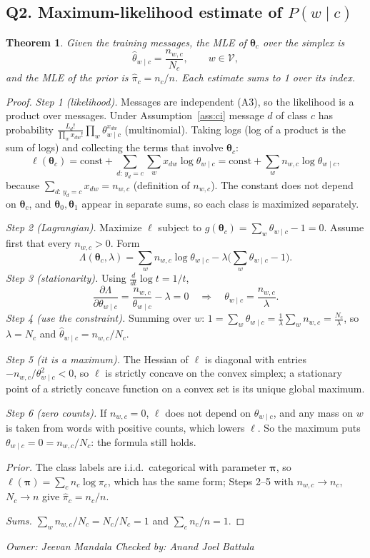 \documentclass[11pt]{article}
\newcommand{\owner}[2]{\par\noindent\textit{Owner: #1 \hfill Checked by: #2}\par\medskip}
\theoremstyle{plain}
\newtheorem{theorem}{Theorem}
\theoremstyle{definition}
\newcommand{\V}{\mathcal{V}}
\begin{document}
\subsection{Q2. Maximum-likelihood estimate of \texorpdfstring{$P(w\mid c)$}{P(w|c)}}\label{sec:q2}

\begin{theorem}\label{thm:mle}
Given the training messages, the MLE of $\boldsymbol\theta_c$ over the simplex is
\[
\hat\theta_{w\mid c}=\frac{n_{w,c}}{N_c},\qquad w\in\V,
\]
and the MLE of the prior is $\hat\pi_c=n_c/n$. Each estimate sums to 1 over its index.
\end{theorem}
\begin{proof}
\textit{Step 1 (likelihood).} Messages are independent (A3), so the likelihood is a product over
messages. Under Assumption~\ref{ass:ci} message $d$ of class $c$ has probability
$\frac{L_d!}{\prod_w x_{dw}!}\prod_w\theta_{w\mid c}^{x_{dw}}$ (multinomial). Taking logs
(log of a product is the sum of logs) and collecting the terms that involve $\boldsymbol\theta_c$:
\[
\ell(\boldsymbol\theta_c)=\text{const}+\sum_{d:\,y_d=c}\sum_{w}x_{dw}\log\theta_{w\mid c}
=\text{const}+\sum_{w}n_{w,c}\log\theta_{w\mid c},
\]
because $\sum_{d:\,y_d=c}x_{dw}=n_{w,c}$ (definition of $n_{w,c}$). The constant does not
depend on $\boldsymbol\theta_c$, and $\boldsymbol\theta_0,\boldsymbol\theta_1$ appear in
separate sums, so each class is maximized separately.

\textit{Step 2 (Lagrangian).} Maximize $\ell$ subject to $g(\boldsymbol\theta_c)=\sum_w\theta_{w\mid c}-1=0$.
Assume first that every $n_{w,c}>0$. Form
\[
\Lambda(\boldsymbol\theta_c,\lambda)=\sum_w n_{w,c}\log\theta_{w\mid c}-\lambda\Big(\sum_w\theta_{w\mid c}-1\Big).
\]
\textit{Step 3 (stationarity).} Using $\frac{d}{dt}\log t=1/t$,
\[
\frac{\partial\Lambda}{\partial\theta_{w\mid c}}=\frac{n_{w,c}}{\theta_{w\mid c}}-\lambda=0
\quad\Longrightarrow\quad\theta_{w\mid c}=\frac{n_{w,c}}{\lambda}.
\]
\textit{Step 4 (use the constraint).} Summing over $w$:
$1=\sum_w\theta_{w\mid c}=\frac{1}{\lambda}\sum_w n_{w,c}=\frac{N_c}{\lambda}$, so $\lambda=N_c$ and
$\hat\theta_{w\mid c}=n_{w,c}/N_c$.

\textit{Step 5 (it is a maximum).} The Hessian of $\ell$ is diagonal with entries
$-n_{w,c}/\theta_{w\mid c}^2<0$, so $\ell$ is strictly concave on the convex simplex; a
stationary point of a strictly concave function on a convex set is its unique global maximum.

\textit{Step 6 (zero counts).} If $n_{w,c}=0$, $\ell$ does not depend on $\theta_{w\mid c}$,
and any mass on $w$ is taken from words with positive counts, which lowers $\ell$. So the
maximum puts $\theta_{w\mid c}=0=n_{w,c}/N_c$: the formula still holds.

\textit{Prior.} The class labels are i.i.d.\ categorical with parameter $\boldsymbol\pi$, so
$\ell(\boldsymbol\pi)=\sum_c n_c\log\pi_c$, which has the same form; Steps 2--5 with
$n_{w,c}\to n_c$, $N_c\to n$ give $\hat\pi_c=n_c/n$.

\textit{Sums.} $\sum_w n_{w,c}/N_c=N_c/N_c=1$ and $\sum_c n_c/n=1$.
\end{proof}
\owner{Jeevan Mandala}{Anand Joel Battula}
\end{document}
